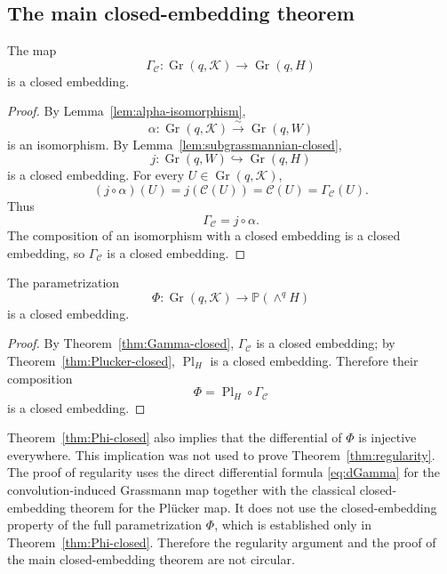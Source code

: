 \documentclass{siamonline250211}
\newcommand{\PP}{\mathbb P}
\newcommand{\Gr}{\operatorname{Gr}}
\newcommand{\Pl}{\operatorname{Pl}}
\newcommand{\cK}{\mathcal K}
\newcommand{\cC}{\mathcal C}
\begin{document}
\subsection{The main closed-embedding theorem}

\begin{theorem}
\label{thm:Gamma-closed}
The map
\[
  \Gamma_{\cC}:\Gr(q,\cK)\longrightarrow\Gr(q,H)
\]
is a closed embedding.
\end{theorem}

\begin{proof}
By Lemma~\ref{lem:alpha-isomorphism},
\[
  \alpha:\Gr(q,\cK)\xrightarrow{\sim}\Gr(q,W)
\]
is an isomorphism. By Lemma~\ref{lem:subgrassmannian-closed},
\[
  j:\Gr(q,W)\hookrightarrow\Gr(q,H)
\]
is a closed embedding. For every $U\in\Gr(q,\cK)$,
\[
  (j\circ\alpha)(U)=j(\cC(U))=\cC(U)=\Gamma_{\cC}(U).
\]
Thus
\[
  \Gamma_{\cC}=j\circ\alpha.
\]
The composition of an isomorphism with a closed embedding is a closed embedding,
so $\Gamma_{\cC}$ is a closed embedding.
\end{proof}

\begin{theorem}
\label{thm:Phi-closed}
The parametrization
\[
  \Phi:\Gr(q,\cK)\longrightarrow\PP(\wedge^qH)
\]
is a closed embedding.
\end{theorem}

\begin{proof}
By Theorem~\ref{thm:Gamma-closed}, $\Gamma_{\cC}$ is a closed embedding; by
Theorem~\ref{thm:Plucker-closed}, $\Pl_H$ is a closed embedding. Therefore their
composition
\[
  \Phi=\Pl_H\circ\Gamma_{\cC}
\]
is a closed embedding.
\end{proof}

\begin{remark}
Theorem~\ref{thm:Phi-closed} also implies that the differential of $\Phi$ is
injective everywhere. This implication was not used to prove
Theorem~\ref{thm:regularity}. The proof of regularity uses the direct
differential formula \eqref{eq:dGamma} for the convolution-induced Grassmann map
together with the classical closed-embedding theorem for the Pl\"ucker map. It
does not use the closed-embedding property of the full parametrization $\Phi$,
which is established only in Theorem~\ref{thm:Phi-closed}. Therefore the
regularity argument and the proof of the main closed-embedding theorem are not
circular.
\end{remark}
\end{document}
